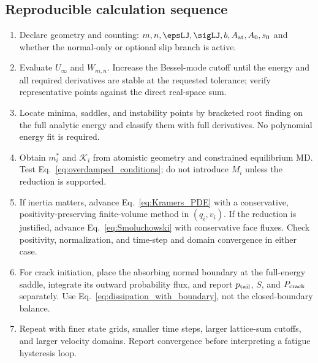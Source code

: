 \subsection{Reproducible calculation sequence}

\begin{enumerate}
  \item Declare geometry and counting: $m,n,\epsLJ,\sigLJ,b,A_{\rm at},A_0,s_0$ and whether the
  normal-only or optional slip branch is active.
  \item Evaluate $U_\infty$ and $W_{m,n}$. Increase the Bessel-mode cutoff until the energy and all
  required derivatives are stable at the requested tolerance; verify representative points against
  the direct real-space sum.
  \item Locate minima, saddles, and instability points by bracketed root finding on the full
  analytic energy and classify them with full derivatives. No polynomial energy fit is required.
  \item Obtain $m_i^*$ and $\mathcal K_i$ from atomistic geometry and constrained equilibrium MD.
  Test Eq.~\eqref{eq:overdamped_conditions}; do not introduce $M_i$ unless the reduction is
  supported.
  \item If inertia matters, advance Eq.~\eqref{eq:Kramers_PDE} with a conservative,
  positivity-preserving finite-volume method in $(q_i,v_i)$. If the reduction is justified, advance
  Eq.~\eqref{eq:Smoluchowski} with conservative face fluxes. Check positivity, normalization, and
  time-step and domain convergence in either case.
  \item For crack initiation, place the absorbing normal boundary at the full-energy saddle,
  integrate its outward probability flux, and report $p_{\rm tail}$, $S$, and $P_{\rm crack}$
  separately. Use Eq.~\eqref{eq:dissipation_with_boundary}, not the closed-boundary balance.
  \item Repeat with finer state grids, smaller time steps, larger lattice-sum cutoffs, and larger
  velocity domains. Report convergence before interpreting a fatigue hysteresis loop.
\end{enumerate}
